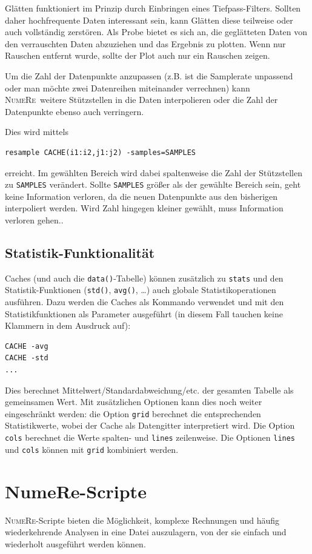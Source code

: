 \documentclass[DIV=14,headsepline,footsepline]{scrbook}
\newcommand{\NR}{\textsc{Nu\-me\-Re}}
\begin{document}
				Glätten funktioniert im Prinzip durch Einbringen eines Tiefpass-Filters. Sollten daher hochfrequente Daten interessant sein, kann Glätten diese teilweise oder auch vollständig zerstören. Als Probe bietet es sich an, die geglätteten Daten von den verrauschten Daten abzuziehen und das Ergebnis zu plotten. Wenn nur Rauschen entfernt wurde, sollte der Plot auch nur ein Rauschen zeigen.
				
				Um die Zahl der Datenpunkte anzupassen (z.B. ist die Samplerate unpassend oder man möchte zwei Datenreihen miteinander verrechnen) kann \NR\ weitere Stützstellen in die Daten interpolieren oder die Zahl der Datenpunkte ebenso auch verringern.
				
				Dies wird mittels
				\begin{lstlisting}
resample CACHE(i1:i2,j1:j2) -samples=SAMPLES
				\end{lstlisting}
				erreicht. Im gewählten Bereich wird dabei spaltenweise die Zahl der Stützstellen zu \verb+SAMPLES+ verändert. Sollte \verb+SAMPLES+ größer als der gewählte Bereich sein, geht keine Information verloren, da die neuen Datenpunkte aus den bisherigen interpoliert werden. Wird Zahl hingegen kleiner gewählt, muss Information verloren gehen..
				
			\section{Statistik-Funktionalität}
				Caches (und auch die \verb+data()+-Tabelle) können zusätzlich zu \verb+stats+ und den Statistik-Funktionen (\verb+std()+, \verb+avg()+, \ldots) auch globale Statistikoperationen ausführen. Dazu werden die Caches als Kommando verwendet und mit den Statistikfunktionen als Parameter ausgeführt (in diesem Fall tauchen keine Klammern in dem Ausdruck auf):
				\begin{lstlisting}
CACHE -avg
CACHE -std
...
				\end{lstlisting}
				Dies berechnet Mittelwert/Standardabweichung/etc. der gesamten Tabelle als gemeinsamen Wert. Mit zusätzlichen Optionen kann dies noch weiter eingeschränkt werden: die Option \verb+grid+ berechnet die entsprechenden Statistikwerte, wobei der Cache als Datengitter interpretiert wird. Die Option \verb+cols+ berechnet die Werte spalten- und \verb+lines+ zeilenweise. Die Optionen \verb+lines+ und \verb+cols+ können mit \verb+grid+ kombiniert werden.
		\chapter{NumeRe-Scripte}
			\NR-Scripte bieten die Möglichkeit, komplexe Rechnungen und häufig wiederkehrende Analysen in eine Datei auszulagern, von der sie einfach und wiederholt ausgeführt werden können.
\end{document}
